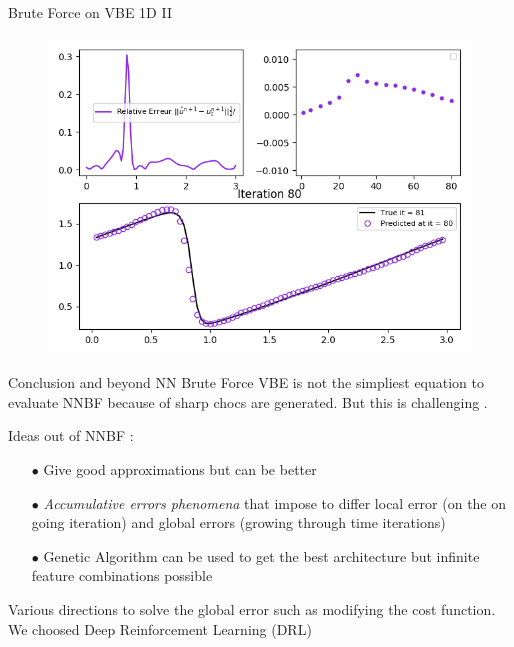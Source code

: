 \documentclass[10pt,
			   xcolor=svgnames,
			   hyperref={linkcolor=red, citecolor = DarkGreen, colorlinks=true, urlcolor=Navy}]{beamer}
\newcommand\bk{\color{black}}
\newcommand\navy{\color{navy}}
\newcommand\red{\color{red}}
\begin{document}
\begin{frame}{Brute Force on VBE 1D II}
	\begin{figure}[H]
	\centering
	\includegraphics[scale=0.5]{Pres_Last_Iteration_2.png}
	\end{figure} 
\end{frame}

\begin{frame}{Conclusion and beyond NN Brute Force}
VBE is not the simpliest equation to evaluate NNBF because of sharp chocs are generated. But this is \navy challenging \bk. \\
 
	\begin{block}{Ideas out of NNBF :}	
		\begin{itemize}
			\item[$\bullet$] Give good approximations but can be better
			\item[$\bullet$] \textit{Accumulative errors phenomena} that impose to differ \red local \bk error (on the on going iteration) and \red global \bk errors (growing through time iterations)
			\item[$\bullet$] Genetic Algorithm can be used to get the best architecture but \red infinite \bk feature combinations possible\\[0.5cm]
		\end{itemize}
	\end{block}
\vspace{3mm}
Various directions to solve the global error such as modifying the cost function. \red We choosed Deep Reinforcement Learning (DRL)\bk

\end{frame}
\end{document}
